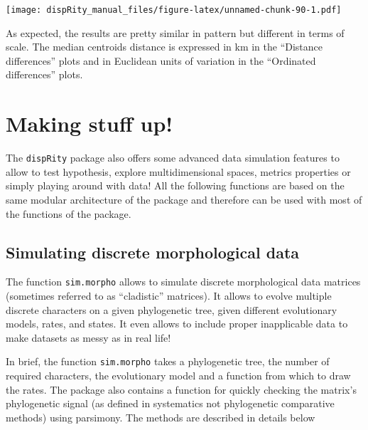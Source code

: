 \documentclass[]{book}
\theoremstyle{definition}
\theoremstyle{definition}
\theoremstyle{definition}
\theoremstyle{remark}
\begin{document}
\texttt{[image: dispRity\_manual\_files/figure-latex/unnamed-chunk-90-1.pdf]}

As expected, the results are pretty similar in pattern but different in
terms of scale. The median centroids distance is expressed in km in the
``Distance differences'' plots and in Euclidean units of variation in
the ``Ordinated differences'' plots.

\chapter{Making stuff up!}\label{making-stuff-up}

The \texttt{dispRity} package also offers some advanced data simulation
features to allow to test hypothesis, explore multidimensional spaces,
metrics properties or simply playing around with data! All the following
functions are based on the same modular architecture of the package and
therefore can be used with most of the functions of the package.

\section{Simulating discrete morphological
data}\label{simulating-discrete-morphological-data}

The function \texttt{sim.morpho} allows to simulate discrete
morphological data matrices (sometimes referred to as ``cladistic''
matrices). It allows to evolve multiple discrete characters on a given
phylogenetic tree, given different evolutionary models, rates, and
states. It even allows to include proper inapplicable data to make
datasets as messy as in real life!

In brief, the function \texttt{sim.morpho} takes a phylogenetic tree,
the number of required characters, the evolutionary model and a function
from which to draw the rates. The package also contains a function for
quickly checking the matrix's phylogenetic signal (as defined in
systematics not phylogenetic comparative methods) using parsimony. The
methods are described in details below
\end{document}
